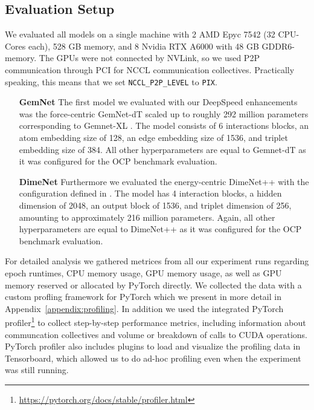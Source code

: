 \subsection{Evaluation Setup}

We evaluated all models on a single machine with 2 AMD Epyc 7542 (32 CPU-Cores each), 528 GB memory, 
and 8 Nvidia RTX A6000 with 48 GB GDDR6-memory. The GPUs were not connected by NVLink, so we used 
P2P communication through PCI for NCCL communication collectives. Practically speaking, this 
means that we set \texttt{NCCL\_P2P\_LEVEL} to \texttt{PIX}.

\begin{enumerate}[align=left]
    \item[\textbf{GemNet}] The first model we evaluated with our DeepSpeed enhancements was 
    the force-centric GemNet-dT scaled up to roughly 292 million parameters corresponding to 
    Gemnet-XL \cite*{https://doi.org/10.48550/arxiv.2203.09697}. 
    The model consists of 6 interactions blocks, an atom embedding size of 128, an edge 
    embedding size of 1536, and triplet embedding size of 384. All other hyperparameters are equal 
    to Gemnet-dT as it was configured for the OCP benchmark evaluation.

    \item[\textbf{DimeNet}] Furthermore we evaluated the energy-centric DimeNet++ with the configuration 
    defined in \cite*{https://doi.org/10.48550/arxiv.2203.09697}. The model has 4 interaction blocks, a hidden 
    dimension of 2048, an output block of 1536, and triplet dimension of 256, amounting to approximately 
    216 million parameters. Again, all other hyperparameters are equal to DimeNet++ as it was configured 
    for the OCP benchmark evaluation.
\end{enumerate}

For detailed analysis we gathered metrices from all our experiment runs regarding epoch runtimes, 
CPU memory usage, GPU memory usage, as well as GPU memory reserved or allocated by PyTorch directly.
We collected the data with a custom profling framework for PyTorch which we present in more detail 
in Appendix~\ref{appendix:profiling}.
In addition we used the integrated PyTorch profiler\footnote{\url{https://pytorch.org/docs/stable/profiler.html}}
to collect step-by-step performance metrics, including information about communcation collectives and 
volume or breakdown of calls to CUDA operations. PyTorch profiler also includes plugins to 
load and visualize the profiling data in Tensorboard, which allowed us to do ad-hoc profiling 
even when the experiment was still running.



